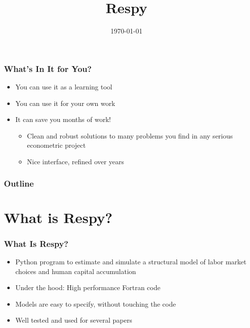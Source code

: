 \documentclass[11pt]{beamer}
\author[\_\_MyName\_\_]
{
{\bf }}
\begin{document}
\title{Respy}
\date{\today}

\begin{frame}
    \maketitle
    \note{~}
\end{frame}


\begin{frame}[c]\frametitle{What's In It for You?}
\begin{itemize}
  \item You can use it as a learning tool
  \item You can use it for your own work
  \item It can save you months of work!
  \begin{itemize}
    \item Clean and robust solutions to many problems you find in any serious econometric project
    \item Nice interface, refined over years
  \end{itemize}
\end{itemize}
\end{frame}


\begin{frame}\frametitle{Outline}
  \hspace{1cm}\begin{minipage}{\textwidth}
    \tableofcontents
  \end{minipage}
\end{frame}




\section{What is Respy?}


\begin{frame}[c]\frametitle{What Is Respy?}
\begin{itemize}
    \item Python program to estimate and simulate a structural model of labor market choices and human capital accumulation
    \item Under the hood: High performance Fortran code
    \item Models are easy to specify, without touching the code
    \item Well tested and used for several papers
\end{itemize}
\end{frame}
\end{document}

